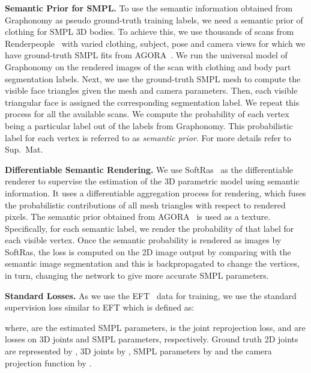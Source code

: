 \documentclass[10pt,twocolumn,letterpaper]{article}
\begin{document}
\textbf{Semantic Prior for SMPL.} To use the semantic information obtained from Graphonomy as pseudo ground-truth training labels, we need a semantic prior of clothing for SMPL 3D bodies. To achieve this, we use thousands of scans from Renderpeople~\cite{renderpeople} with varied clothing, subject, pose and  camera views for which we have ground-truth SMPL fits from AGORA~\cite{agora}. We run the universal model of Graphonomy on the rendered images of the scan with  clothing and body part segmentation labels. Next, we use the ground-truth SMPL mesh to compute the visible face triangles given the mesh and camera parameters. Then, each visible triangular face is assigned the corresponding segmentation label. We repeat this process for all the available scans. We compute the probability of each vertex being a particular label out of the  labels from Graphonomy. This probabilistic label for each vertex is referred to as \emph{semantic prior}. For more details refer to Sup.~Mat. 

\textbf{Differentiable Semantic Rendering.} We use SoftRas~\cite{softras} as the differentiable renderer to supervise the estimation of the 3D parametric model using semantic information. It uses a differentiable aggregation process for rendering, which fuses the probabilistic contributions of all mesh triangles with respect to rendered pixels. The semantic prior obtained from AGORA~\cite{agora} is used as a texture. Specifically, for each semantic label, we render the probability of that label for each visible vertex. Once the semantic probability is rendered as images by SoftRas, the loss is computed on the 2D image output by comparing with the semantic image segmentation and this is backpropagated to change the vertices, in turn, changing the network to give more accurate SMPL parameters. 

\textbf{Standard Losses.} As we use the EFT~\cite{eft} data for training, we use the standard supervision loss  similar to EFT which is defined as:

where,  are the estimated SMPL parameters,  is the joint reprojection loss,  and  are losses on 3D joints and SMPL parameters, respectively. Ground truth 2D joints are represented by , 3D joints by , SMPL parameters by  and the camera projection function by .
\end{document}
